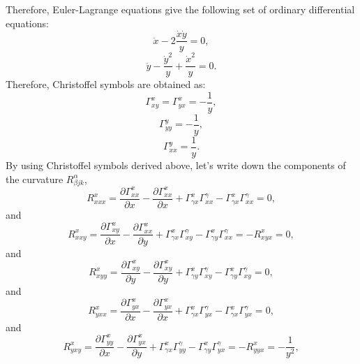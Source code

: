 \documentclass[11pt]{amsart}
\begin{document}
Therefore, Euler-Lagrange equations give the following set of ordinary differential equations:
\begin{equation}
\label{eq:5}
\ddot{x}-2\frac{\dot{x}\dot{y}}{y}=0,
\end{equation}
\begin{equation}
\label{eq:5}
\ddot{y}-\frac{\dot{y}^2}{y}+\frac{\dot{x}^2}{y}=0.
\end{equation}
Therefore, Christoffel symbols are obtained as:
\begin{equation}
\Gamma_{x y}^{x}=\Gamma_{y x}^{x}=-\frac{1}{y},
\end{equation}
\begin{equation}
\Gamma_{y y}^{y}=-\frac{1}{y},
\end{equation}
\begin{equation}
\Gamma_{x x}^{y}=\frac{1}{y}.
\end{equation}
By using Christoffel symbols derived above, let's write down the components of  the curvature $R_{\beta jk}^{\alpha}$,
\begin{equation}
R_{xxx}^{x}=\frac{\partial \Gamma_{x x}^{x}}{\partial x}-\frac{\partial \Gamma_{x x}^{x}}{\partial x}+ \Gamma_{\gamma x}^{x} \Gamma_{x x}^{\gamma}- \Gamma_{\gamma x}^{x} \Gamma_{x x}^{\gamma}=0,
\end{equation}
and
\begin{equation}
R_{xxy}^{x}=\frac{\partial \Gamma_{x y}^{x}}{\partial x}-\frac{\partial \Gamma_{x x}^{x}}{\partial y}+ \Gamma_{\gamma x}^{x} \Gamma_{x y}^{\gamma}- \Gamma_{\gamma y}^{x} \Gamma_{x x}^{\gamma}=-R_{xyx}^{x}=0,
\end{equation}
and
\begin{equation}
R_{xyy}^{x}=\frac{\partial \Gamma_{x y}^{x}}{\partial y}-\frac{\partial \Gamma_{x y}^{x}}{\partial y}+ \Gamma_{\gamma y}^{x} \Gamma_{x y}^{\gamma}- \Gamma_{\gamma y}^{x} \Gamma_{x y}^{\gamma}=0,
\end{equation}
and
\begin{equation}
R_{yxx}^{x}=\frac{\partial \Gamma_{y x}^{x}}{\partial x}-\frac{\partial \Gamma_{y x}^{x}}{\partial x}+ \Gamma_{\gamma x}^{x} \Gamma_{y x}^{\gamma}- \Gamma_{\gamma x}^{x} \Gamma_{y x}^{\gamma}=0,
\end{equation}
and
\begin{equation}
R_{yxy}^{x}=\frac{\partial \Gamma_{y y}^{x}}{\partial x}-\frac{\partial \Gamma_{y x}^{x}}{\partial y}+ \Gamma_{\gamma x}^{x} \Gamma_{y y}^{\gamma}- \Gamma_{\gamma y}^{x} \Gamma_{y x}^{\gamma}=-R_{yyx}^{x}=-\frac{1}{y^2},
\end{equation}
\end{document}
